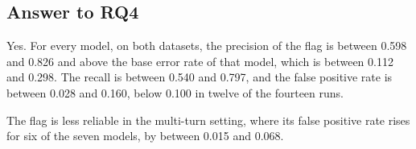 \FloatBarrier

\subsection{Answer to RQ4}
\label{subsec:ch8-rq4-answer}

\label{rq:ch8-rq4}


\noindent Yes. For every model, on both datasets, the precision of the flag is between 0.598 and 0.826 and above the base error rate of that model, which is between 0.112 and 0.298. The recall is between 0.540 and 0.797, and the false positive rate is between 0.028 and 0.160, below 0.100 in twelve of the fourteen runs.

The flag is less reliable in the multi-turn setting, where its false positive rate rises for six of the seven models, by between 0.015 and 0.068.

\FloatBarrier
